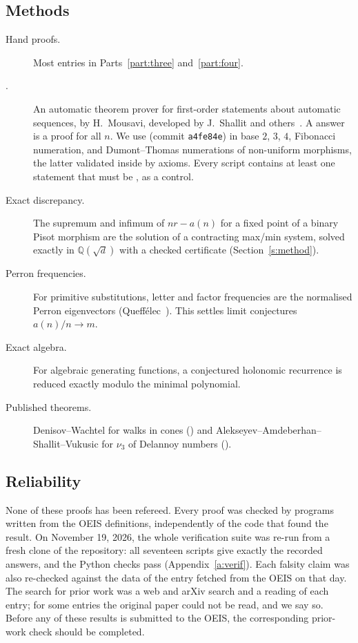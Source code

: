 \subsection{Methods}
\begin{description}
\item[Hand proofs.] Most entries in Parts~\ref{part:three} and~\ref{part:four}.
\item[\Walnut.] An automatic theorem prover for first-order statements about automatic sequences, by
  H.~Mousavi, developed by J.~Shallit and others~\cite{Mo,Sh}. A \TRUE{} answer is a proof for all $n$. We
  use \Walnut{} (commit \texttt{a4fe84e}) in base $2$, $3$, $4$, Fibonacci numeration, and Dumont--Thomas
  numerations of non-uniform morphisms, the latter validated inside \Walnut{} by axioms. Every script
  contains at least one statement that must be \FALSE, as a control.
\item[Exact discrepancy.] The supremum and infimum of $nr-a(n)$ for a fixed point of a binary Pisot morphism
  are the solution of a contracting max/min system, solved exactly in $\mathbb{Q}(\sqrt d)$ with a checked
  certificate (Section~\ref{s:method}).
\item[Perron frequencies.] For primitive substitutions, letter and factor frequencies are the normalised
  Perron eigenvectors (Queffélec~\cite{Qu}). This settles limit conjectures $a(n)/n\to m$.
\item[Exact algebra.] For algebraic generating functions, a conjectured holonomic recurrence is reduced
  exactly modulo the minimal polynomial.
\item[Published theorems.] Denisov--Wachtel for walks in cones () and
  Alekseyev--Amdeberhan--Shallit--Vukusic for $\nu_3$ of Delannoy numbers ().
\end{description}

\subsection{Reliability}
None of these proofs has been refereed. Every proof was
checked by programs written from the OEIS definitions, independently of the code that found the result.
On November 19, 2026, the whole verification suite was re-run from a fresh clone of the repository: all
seventeen \Walnut{} scripts give exactly the recorded answers, and the Python checks pass (Appendix~\ref{a:verif}).
Each falsity claim was also re-checked against the data of the entry fetched from the OEIS on that day.
The search for prior work was a web and arXiv search and a reading of each entry; for some entries the
original paper could not be read, and we say so. Before any of these results is submitted to the OEIS,
the corresponding prior-work check should be completed.

